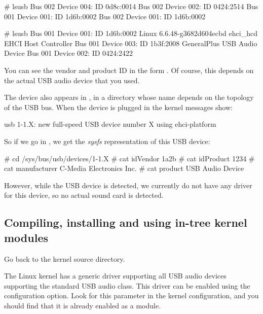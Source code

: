 \if{}
\begin{bashinput}
# lsusb
Bus 002 Device 004: ID 0d8c:0014
Bus 002 Device 002: ID 0424:2514
Bus 001 Device 001: ID 1d6b:0002
Bus 002 Device 001: ID 1d6b:0002
\end{bashinput}
\fi
\if{}
\begin{bashinput}
# lsusb
Bus 001 Device 001: ID 1d6b:0002 Linux 6.6.48-g3682d604ecbd ehci_hcd EHCI Host Controller
Bus 001 Device 003: ID 1b3f:2008 GeneralPlus USB Audio Device
Bus 001 Device 002: ID 0424:2422
\end{bashinput}
\fi

You can see the vendor and product ID in the form .
Of course, this depends on the actual USB audio device
that you used.

The device also appears in , in a
directory whose name depends on the topology of the USB bus. When the
device is plugged in the kernel messages show:

\begin{bashinput}
usb 1-1.X: new full-speed USB device number X using ehci-platform
\end{bashinput}

So if we go in , we get the {\em
sysfs} representation of this USB device:

\begin{bashinput}
# cd /sys/bus/usb/devices/1-1.X
# cat idVendor
1a2b
# cat idProduct
1234
# cat manufacturer
C-Media Electronics Inc.
# cat product
USB Audio Device
\end{bashinput}

However, while the USB device is detected, we currently do not have
any driver for this device, so no actual sound card is detected.

\subsection{Compiling, installing and using in-tree kernel modules}

Go back to the kernel source directory.

The Linux kernel has a generic driver supporting all USB audio devices
supporting the standard USB audio class. This driver can be enabled
using the  configuration option. Look
for this parameter in the kernel configuration, and you should find
that it is already enabled as a module.

